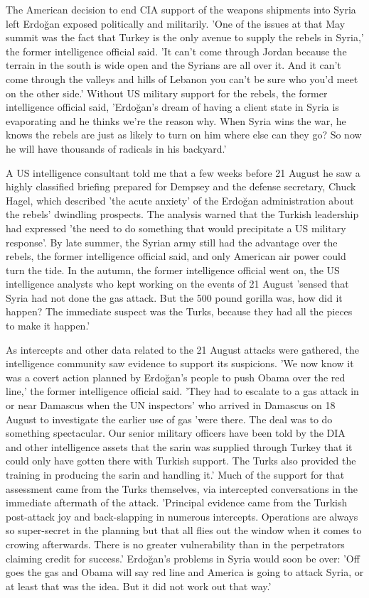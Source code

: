 The American decision to end CIA support of the weapons shipments
into Syria left Erdo\u{g}an exposed politically and militarily. 'One
of the issues at that May summit was the fact that Turkey is the only
avenue to supply the rebels in Syria,' the former intelligence official
said. 'It can't come through Jordan because the terrain in the south
is wide open and the Syrians are all over it. And it can't come through
the valleys and hills of Lebanon \textendash{} you can't be sure who
you'd meet on the other side.' Without US military support for the
rebels, the former intelligence official said, 'Erdo\u{g}an's dream
of having a client state in Syria is evaporating and he thinks we're
the reason why. When Syria wins the war, he knows the rebels are just
as likely to turn on him \textendash{} where else can they go? So
now he will have thousands of radicals in his backyard.'

A US intelligence consultant told me that a few weeks before 21 August
he saw a highly classified briefing prepared for Dempsey and the defense
secretary, Chuck Hagel, which described 'the acute anxiety' of the
Erdo\u{g}an administration about the rebels' dwindling prospects.
The analysis warned that the Turkish leadership had expressed 'the
need to do something that would precipitate a US military response'.
By late summer, the Syrian army still had the advantage over the rebels,
the former intelligence official said, and only American air power
could turn the tide. In the autumn, the former intelligence official
went on, the US intelligence analysts who kept working on the events
of 21 August 'sensed that Syria had not done the gas attack. But the
500 pound gorilla was, how did it happen? The immediate suspect was
the Turks, because they had all the pieces to make it happen.'

As intercepts and other data related to the 21 August attacks were
gathered, the intelligence community saw evidence to support its suspicions.
'We now know it was a covert action planned by Erdo\u{g}an's people
to push Obama over the red line,' the former intelligence official
said. 'They had to escalate to a gas attack in or near Damascus when
the UN inspectors' \textendash{} who arrived in Damascus on 18 August
to investigate the earlier use of gas \textendash{} 'were there. The
deal was to do something spectacular. Our senior military officers
have been told by the DIA and other intelligence assets that the sarin
was supplied through Turkey \textendash{} that it could only have
gotten there with Turkish support. The Turks also provided the training
in producing the sarin and handling it.' Much of the support for that
assessment came from the Turks themselves, via intercepted conversations
in the immediate aftermath of the attack. 'Principal evidence came
from the Turkish post-attack joy and back-slapping in numerous intercepts.
Operations are always so super-secret in the planning but that all
flies out the window when it comes to crowing afterwards. There is
no greater vulnerability than in the perpetrators claiming credit
for success.' Erdo\u{g}an's problems in Syria would soon be over:
'Off goes the gas and Obama will say red line and America is going
to attack Syria, or at least that was the idea. But it did not work
out that way.'


